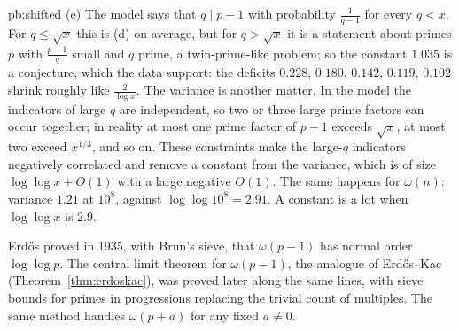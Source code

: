 \begin{solution}{pb:shifted}
(e) The model says that $q\mid p-1$ with probability $\frac1{q-1}$ for every $q<x$. For $q\le\sqrt x$ this is (d) on average, but for $q>\sqrt x$ it is a statement about primes $p$
with $\frac{p-1}q$ small and $q$ prime, a twin-prime-like problem; so the constant $1.035$ is a conjecture, which the data support: the deficits $0.228$, $0.180$, $0.142$, $0.119$,
$0.102$ shrink roughly like $\frac2{\log x}$. The variance is another matter. In the model the indicators of large $q$ are independent, so two or three large prime factors can
occur together; in reality at most one prime factor of $p-1$ exceeds $\sqrt x$, at most two exceed $x^{1/3}$, and so on. These constraints make the large-$q$ indicators negatively
correlated and remove a constant from the variance, which is of size $\log\log x+O(1)$ with a large negative $O(1)$. The same happens for $\omega(n)$: variance $1.21$ at $10^8$,
against $\log\log10^8=2.91$. A constant is a lot when $\log\log x$ is $2.9$.


\leads Erd\H os proved in 1935, with Brun's sieve, that $\omega(p-1)$ has normal order $\log\log p$. The central limit theorem for $\omega(p-1)$, the analogue of Erd\H os--Kac
(Theorem~\ref{thm:erdoskac}), was proved later along the same lines, with sieve bounds for primes in progressions replacing the trivial count of multiples. The same method handles $\omega(p+a)$ for any fixed $a\ne0$.
\end{solution}

